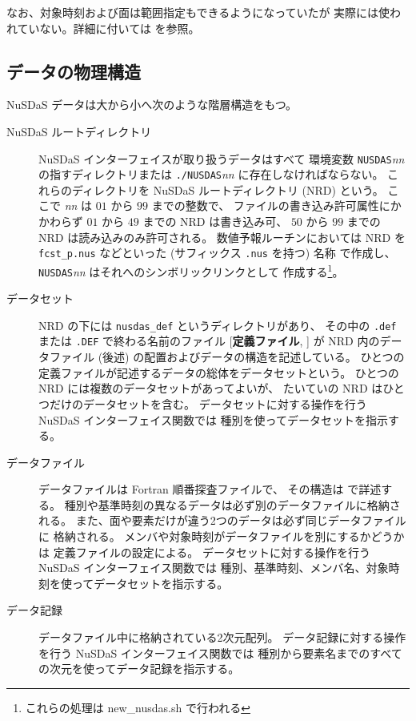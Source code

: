 なお、対象時刻および面は範囲指定もできるようになっていたが
実際には使われていない。詳細に付いては  を参照。

\subsection{データの物理構造}

NuSDaS データは大から小へ次のような階層構造をもつ。

\begin{description}
\item[NuSDaS ルートディレクトリ]
	NuSDaS インターフェイスが取り扱うデータはすべて
	環境変数 {\tt NUSDAS}{\it nn} の指すディレクトリまたは
	{\tt ./NUSDAS}{\it nn} に存在しなければならない。
	これらのディレクトリを NuSDaS ルートディレクトリ (NRD) という。
	ここで {\it nn} は $01$ から $99$ までの整数で、
	ファイルの書き込み許可属性にかかわらず
	$01$ から $49$ までの NRD は書き込み可、
	$50$ から $99$ までの NRD は読み込みのみ許可される。
	数値予報ルーチンにおいては NRD を
	{\tt fcst\_p.nus} などといった (サフィックス {\tt .nus} を持つ) 名称
	で作成し、{\tt NUSDAS}{\it nn} はそれへのシンボリックリンクとして
	作成する\footnote{これらの処理は new\_nusdas.sh で行われる}。
\item[データセット]
	NRD の下には {\tt nusdas\_def} というディレクトリがあり、
	その中の {\tt .def} または {\tt .DEF} で終わる名前のファイル
	[{\bf 定義ファイル}, ]
	が NRD 内のデータファイル (後述)
	の配置およびデータの構造を記述している。
	ひとつの定義ファイルが記述するデータの総体をデータセットという。
	ひとつの NRD には複数のデータセットがあってよいが、
	たいていの NRD はひとつだけのデータセットを含む。
	データセットに対する操作を行う NuSDaS インターフェイス関数では
	種別を使ってデータセットを指示する。
\item[データファイル]
	データファイルは Fortran 順番探査ファイルで、
	その構造は  で詳述する。
	種別や基準時刻の異なるデータは必ず別のデータファイルに格納される。
	また、面や要素だけが違う2つのデータは必ず同じデータファイルに
	格納される。
	メンバや対象時刻がデータファイルを別にするかどうかは
	定義ファイルの設定による。
	データセットに対する操作を行う NuSDaS インターフェイス関数では
	種別、基準時刻、メンバ名、対象時刻を使ってデータセットを指示する。
\item[データ記録]
	データファイル中に格納されている2次元配列。
	データ記録に対する操作を行う NuSDaS インターフェイス関数では
	種別から要素名までのすべての次元を使ってデータ記録を指示する。
\end{description}

